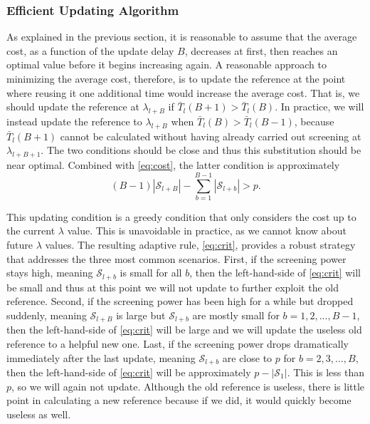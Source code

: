 \subsubsection{Efficient Updating Algorithm}

As explained in the previous section, it is reasonable to assume that the average cost, as a function of the update delay $B$, decreases at first, then reaches an optimal value before it begins increasing again. A reasonable approach to minimizing the average cost, therefore, is to update the reference at the point where reusing it one additional time would increase the average cost. That is, we should update the reference at $\lambda_{l+B}$ if $\bar{T}_l(B+1)>\bar{T}_l(B)$. In practice, we will instead update the reference to $\lambda_{l+B}$ when $\bar{T}_l(B)>\bar{T}_l(B-1)$, because $\bar{T}_l(B+1)$ cannot be calculated without having already carried out screening at $\lambda_{l+B+1}$. The two conditions should be close and thus this substitution should be near optimal. Combined with \eqref{eq:cost}, the latter condition is approximately
\begin{equation}
    \label{eq:crit}
    (B-1)|\mathcal{S}_{l+B}|-\sum_{b=1}^{B-1}|\mathcal{S}_{l+b}|>p.
\end{equation}


This updating condition is a greedy condition that only considers the cost up to the current $\lambda$ value. This is unavoidable in practice, as we cannot know about future $\lambda$ values. The resulting adaptive rule, \eqref{eq:crit}, provides a robust strategy that addresses the three most common scenarios. First, if the screening power stays high, meaning $\mathcal{S}_{l+b}$ is small for all $b$, then the left-hand-side of \eqref{eq:crit} will be small and thus at this point we will not update to further exploit the old reference. Second, if the screening power has been high for a while but dropped suddenly, meaning $\mathcal{S}_{l+B}$ is large but $\mathcal{S}_{l+b}$ are mostly small for $b=1,2,...,B-1$, then the left-hand-side of \eqref{eq:crit} will be large and we will update the useless old reference to a helpful new one. Last, if the screening power drops dramatically immediately after the last update, meaning $\mathcal{S}_{l+b}$ are close to $p$ for $b=2,3,...,B$, then the left-hand-side of \eqref{eq:crit} will be approximately $p-|\mathcal{S}_1|$. This is less than $p$, so we will again not update.  Although the old reference is useless, there is little point in calculating a new reference because if we did, it would quickly become useless as well.

